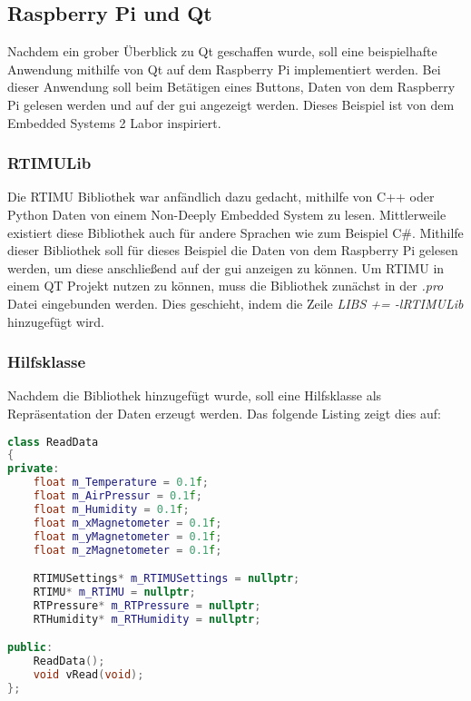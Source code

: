 \subsection{Raspberry Pi und Qt}
\label{subsec:rasPiUndQt}
Nachdem ein grober Überblick zu Qt geschaffen wurde, soll eine beispielhafte Anwendung
mithilfe von Qt auf dem Raspberry Pi implementiert werden. Bei dieser Anwendung soll beim
Betätigen eines Buttons, Daten von dem Raspberry Pi gelesen werden und auf der \ac{gui} angezeigt
werden. Dieses Beispiel ist von dem Embedded Systems 2 Labor inspiriert.

\subsubsection{RTIMULib}
\label{subsubsec:RTIMULib}
Die RTIMU Bibliothek war anfändlich dazu gedacht, mithilfe von C++ oder
Python Daten von einem Non-Deeply Embedded System zu lesen. Mittlerweile existiert diese
Bibliothek auch für andere Sprachen wie zum Beispiel C\#.
\newline
\newline
Mithilfe dieser Bibliothek soll für dieses Beispiel die Daten von dem Raspberry Pi gelesen
werden, um diese anschließend auf der \ac{gui} anzeigen zu können. Um RTIMU in einem QT
Projekt nutzen zu können, muss die Bibliothek zunächst in der \emph{.pro} Datei eingebunden
werden. Dies geschieht, indem die Zeile \emph{LIBS += -lRTIMULib} hinzugefügt wird.

\subsubsection{Hilfsklasse}
\label{subsubsec:Hilfsklasse}
Nachdem die Bibliothek hinzugefügt wurde, soll eine Hilfsklasse als Repräsentation der Daten
erzeugt werden. Das folgende Listing zeigt dies auf:

\begin{lstlisting}[language=C++, caption=RTIMU-Hilfsklasse, label=lst:Hilfsklasse]
class ReadData
{
private:
    float m_Temperature = 0.1f;
    float m_AirPressur = 0.1f;
    float m_Humidity = 0.1f;
    float m_xMagnetometer = 0.1f;
    float m_yMagnetometer = 0.1f;
    float m_zMagnetometer = 0.1f;

    RTIMUSettings* m_RTIMUSettings = nullptr;
    RTIMU* m_RTIMU = nullptr;
    RTPressure* m_RTPressure = nullptr;
    RTHumidity* m_RTHumidity = nullptr;

public:
    ReadData();
    void vRead(void);
};

\end{lstlisting}

